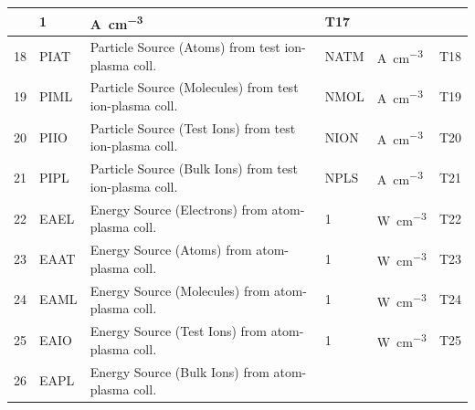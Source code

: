 \begin{landscape}
\begin{longtable}{|r|l|l|l|l|c|}
					     & 1                                &
    \si{\ampere\per\cubic\centi\metre}       & T17
    \\   \hline
    18                                       & PIAT                             &
    Particle Source (Atoms) from test ion-plasma coll.
					     & NATM                             &
    \si{\ampere\per\cubic\centi\metre}       & T18
    \\  \hline
    19                                       & PIML                             &
    Particle Source (Molecules) from test ion-plasma coll.
					     & NMOL                             &
    \si{\ampere\per\cubic\centi\metre}       & T19
    \\  \hline
    20                                       & PIIO                             &
    Particle Source (Test Ions) from test ion-plasma coll.
					     & NION                             &
    \si{\ampere\per\cubic\centi\metre}       & T20
    \\   \hline
    21                                       & PIPL                             &
    Particle Source (Bulk Ions) from test ion-plasma coll.
					     & NPLS                             &
    \si{\ampere\per\cubic\centi\metre}       & T21
    \\   \hline
    22                                       & EAEL                             & Energy
    Source (Electrons) from atom-plasma coll.
					     & 1                                &
    \si{\watt\per\cubic\centi\metre}         & T22
    \\  \hline
    23                                       & EAAT                             & Energy
    Source (Atoms) from atom-plasma coll.
					     & 1                                &
    \si{\watt\per\cubic\centi\metre}         & T23
    \\   \hline
    24                                       & EAML                             & Energy
    Source (Molecules) from atom-plasma coll.
					     & 1                                &
    \si{\watt\per\cubic\centi\metre}         & T24
    \\	\hline
    25                                       & EAIO                             & Energy
    Source (Test Ions) from atom-plasma coll.
					     & 1                                &
    \si{\watt\per\cubic\centi\metre}         & T25
    \\ \hline
    26                                       & EAPL                             & Energy
    Source (Bulk Ions) from atom-plasma coll.

\end{longtable}
\end{landscape}
